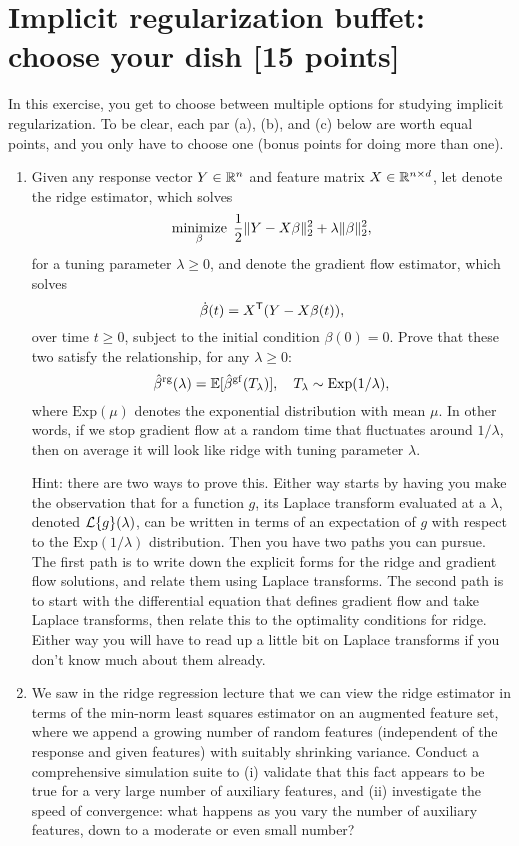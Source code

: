 \documentclass{article}
\begin{document}
\section{Implicit regularization buffet: choose your dish [15 points]} 

In this exercise, you get to choose between multiple options for studying
implicit regularization. To be clear, each par (a), (b), and (c) below are worth
equal points, and you only have to choose one (bonus points for doing more than
one). 

\begin{enumerate}[label=(\alph*)]
\item Given any response vector $Y \in \mathbb{R}^n$ and feature matrix $X \in \mathbb{R}^{n
    \times d}$, let  denote the ridge
  estimator, which solves  
  \[
  \mathop{\mathrm{minimize}}_\beta \; \frac{1}{2} \|Y - X\beta\|_2^2 + \lambda \|\beta\|_2^2,
  \]
  for a tuning parameter $\lambda \geq 0$, and 
  denote the gradient flow estimator, which solves 
  \[
  \dot\beta(t) = X^{\mathsf{T}} (Y - X\beta(t)),
  \]
  over time $t \geq 0$, subject to the initial condition $\beta(0)=0$. Prove
  that these two satisfy the relationship, for any $\lambda \geq 0$:
  \[
  \hat{\beta}^{\mathrm{rg}}(\lambda) = \mathbb{E}[ \hat{\beta}^{\mathrm{gf}}(T_\lambda) ], \quad 
  \text{$T_\lambda \sim \mathrm{Exp}(1/\lambda)$},
  \]
  where $\mathrm{Exp}(\mu)$ denotes the exponential distribution with mean
  $\mu$. In other words, if we stop gradient flow at a random time that
  fluctuates around $1/\lambda$, then on average it will look like ridge with 
  tuning parameter $\lambda$.

  Hint: there are two ways to prove this. Either way starts by having you make
  the observation that for a function $g$, its Laplace transform evaluated at a
  $\lambda$, denoted $\mathcal{L}\{g\}(\lambda)$, can be written in terms of an
  expectation of $g$ with respect to the $\mathrm{Exp}(1/\lambda)$ distribution.
  Then you have two paths you can pursue. The first path is to write down the 
  explicit forms for the ridge and gradient flow solutions, and relate them
  using Laplace transforms. The second path is to start with the differential
  equation that defines gradient flow and take Laplace transforms, then relate
  this to the optimality conditions for ridge. Either way you will have to read
  up a little bit on Laplace transforms if you don't know much about them
  already. 

\item We saw in the ridge regression lecture that we can view the ridge
  estimator in terms of the min-norm least squares estimator on an augmented
  feature set, where we append a growing number of random features (independent
  of the response and given features) with suitably shrinking variance. Conduct
  a comprehensive simulation suite to (i) validate that this fact appears to be
  true for a very large number of auxiliary features, and (ii) investigate the
  speed of convergence: what happens as you vary the number of auxiliary
  features, down to a moderate or even small number? 


\end{enumerate}
\end{document}
